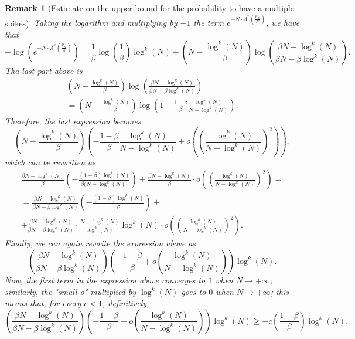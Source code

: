 \documentclass[11pt, a4paper]{article}
\newtheorem{remark}[theorem]{Remark}
\begin{document}
 \begin{remark}[Estimate on the upper bound for the probability to have a multiple spikes]
Taking the logarithm and multiplying by $-1$ the term $e^{- N \cdot \Lambda^* \left( \frac{p_N}{N} \right) }$, we have that \begin{equation} \label{other:claim} - \log \left( e^{- N \cdot \Lambda^*\left(\frac{p_N}{\beta}\right)} \right) = \frac{1}{\beta} \log \left( \frac{1}{\beta} \right) \log^k(N) + \left( N - \frac{\log^k(N)}{\beta} \right) \log \left( \frac{\beta N  - \log^k(N)}{\beta N - \beta \log^k(N)} \right). \end{equation} Tha last part above is \begin{multline*} \left( N - \frac{\log^k(N)}{\beta} \right) \log \left( \frac{\beta N  - \log^k(N)}{\beta N - \beta \log^k(N)} \right) = \\ = \left( N - \frac{\log^k(N)}{\beta} \right) \log \left( 1 - \frac{1 - \beta}{\beta} \frac{\log^k(N)}{N - \log^k(N)} \right). \end{multline*}
Therefore, the last expression becomes \[ \left( N - \frac{\log^k(N)}{\beta} \right) \left( - \frac{1 - \beta}{\beta} \frac{\log^k(N)}{N - \log^k(N)} + o \left( \left( \frac{\log^{k}(N)}{N - \log^k(N)} \right)^2 \right) \right), \] which can be rewritten as \begin{multline*} \frac{ \beta N - \log^k(N)}{\beta} \left( - \frac{(1 - \beta) \log^k(N)}{\beta \big( N - \log^k(N) \big) } \right) + \frac{ \beta N - \log^k(N)}{\beta} \cdot o \left( \left( \frac{\log^{k}(N)}{N - \log^k(N)} \right)^2 \right) = \\ = \frac{ \beta N - \log^k(N) }{ \beta N - \beta \log^k(N) } \left( - \frac{(1 - \beta) \log^k(N)}{\beta} \right) + \\ + \frac{ \beta N - \log^k(N)}{ \beta N - \beta \log^k(N) } \cdot \frac{ N - \log^k(N) }{ \log^k(N) } \log^k(N) \cdot o \left( \left( \frac{\log^{k}(N)}{N - \log^k(N)} \right)^2 \right). \end{multline*}
Finally, we can again rewrite the expression above as \[ \left( \frac{ \beta N - \log^k(N) }{ \beta N - \beta \log^k(N) } \right) \left( - \frac{1 - \beta}{\beta} + o \left( \frac{\log^{k}(N)}{N - \log^k(N)} \right) \right) \log^k(N). \]
Now, the first term in the expression above converges to $1$ when $N \to +\infty$; similarly, the "small o" multiplied by $\log^k(N)$ goes to $0$ when $N \to +\infty$; this means that, for every $c < 1$, definitively, \[ \left( \frac{ \beta N - \log^k(N) }{ \beta N - \beta \log^k(N) } \right) \left( - \frac{1 - \beta}{\beta} + o \left( \frac{\log^{k}(N)}{N - \log^k(N)} \right) \right) \log^k(N) \geq -c \left( \frac{1-\beta}{\beta} \right) \log^k(N). \]
  

\end{remark}
\end{document}
